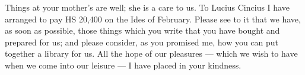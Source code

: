 

 Things at your mother's are well; she is a care to us. To Lucius Cincius I have arranged to pay HS 20,400 on the Ides of February. Please see to it that we have, as soon as possible, those things which you write that you have bought and prepared for us; and please consider, as you promised me, how you can put together a library for us. All the hope of our pleasures --- which we wish to have when we come into our leisure --- I have placed in your kindness.
